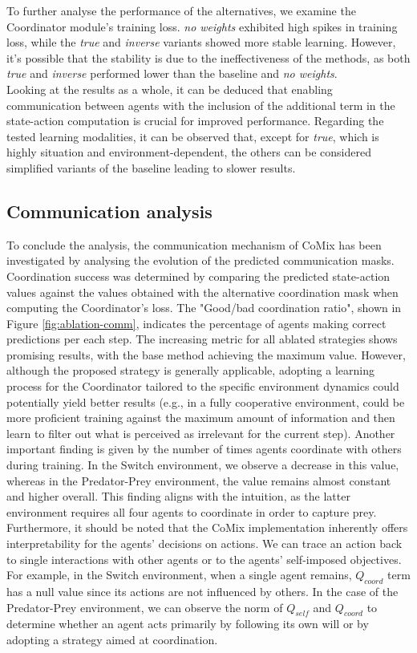 \documentclass[a4paper,singleside,12pt]{report} %
\begin{document}
To further analyse the performance of the alternatives, we examine the Coordinator module's training loss. \textit{no weights} exhibited high spikes in training loss, while the \textit{true} and \textit{inverse} variants showed more stable learning. However, it's possible that the stability is due to the ineffectiveness of the methods, as both \textit{true} and \textit{inverse} performed lower than the baseline and \textit{no weights}.\\
Looking at the results as a whole, it can be deduced that enabling communication between agents with the inclusion of the additional term in the state-action computation is crucial for improved performance. Regarding the tested learning modalities, it can be observed that, except for \textit{true}, which is highly situation and environment-dependent, the others can be considered simplified variants of the baseline leading to slower results.

\subsection{Communication analysis}\label{comm-analysis}
To conclude the analysis, the communication mechanism of CoMix has been investigated by analysing the evolution of the predicted communication masks. Coordination success was determined by comparing the predicted state-action values against the values obtained with the alternative coordination mask when computing the Coordinator's loss. The "Good/bad coordination ratio", shown in Figure \ref{fig:ablation-comm}, indicates the percentage of agents making correct predictions per each step. The increasing metric for all ablated strategies shows promising results, with the base method achieving the maximum value. However, although the proposed strategy is generally applicable, adopting a learning process for the Coordinator tailored to the specific environment dynamics could potentially yield better results (e.g., in a fully cooperative environment, could be more proficient training against the maximum amount of information and then learn to filter out what is perceived as irrelevant for the current step). Another important finding is given by the number of times agents coordinate with others during training. In the Switch environment, we observe a decrease in this value, whereas in the Predator-Prey environment, the value remains almost constant and higher overall. This finding aligns with the intuition, as the latter environment requires all four agents to coordinate in order to capture prey.\\
Furthermore, it should be noted that the CoMix implementation inherently offers interpretability for the agents' decisions on actions. We can trace an action back to single interactions with other agents or to the agents' self-imposed objectives. For example, in the Switch environment, when a single agent remains, $Q_{coord}$ term has a null value since its actions are not influenced by others. In the case of the Predator-Prey environment, we can observe the norm of $Q_{self}$ and $Q_{coord}$ to determine whether an agent acts primarily by following its own will or by adopting a strategy aimed at coordination.
\end{document}
